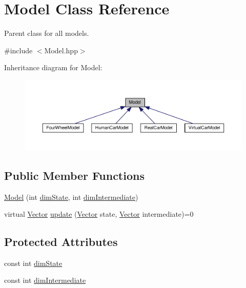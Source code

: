 \hypertarget{classModel}{}\section{Model Class Reference}
\label{classModel}


Parent class for all models.  




{\ttfamily \#include $<$Model.\+hpp$>$}



Inheritance diagram for Model\+:\nopagebreak
\begin{figure}[H]
\begin{center}
\leavevmode
\includegraphics[width=350pt]{classModel__inherit__graph}
\end{center}
\end{figure}
\subsection*{Public Member Functions}
\begin{DoxyCompactItemize}
\item 
\hyperlink{classModel_ad9b9c0a0880f02066bcc3e1e4fba4319}{Model} (int \hyperlink{classModel_a863cbb90f0192bfdaced9d15c6757890}{dim\+State}, int \hyperlink{classModel_a0fd04d08ff3bdafdaf747713ffc824f0}{dim\+Intermediate})
\item 
virtual \hyperlink{Agent_8hpp_a5dd127bb3cb18b011cf5fd80a906e830}{Vector} \hyperlink{classModel_a887e642d0c195b771af8300c7c817f09}{update} (\hyperlink{Agent_8hpp_a5dd127bb3cb18b011cf5fd80a906e830}{Vector} state, \hyperlink{Agent_8hpp_a5dd127bb3cb18b011cf5fd80a906e830}{Vector} intermediate)=0
\end{DoxyCompactItemize}
\subsection*{Protected Attributes}
\begin{DoxyCompactItemize}
\item 
const int \hyperlink{classModel_a863cbb90f0192bfdaced9d15c6757890}{dim\+State}
\item 
const int \hyperlink{classModel_a0fd04d08ff3bdafdaf747713ffc824f0}{dim\+Intermediate}
\end{DoxyCompactItemize}


